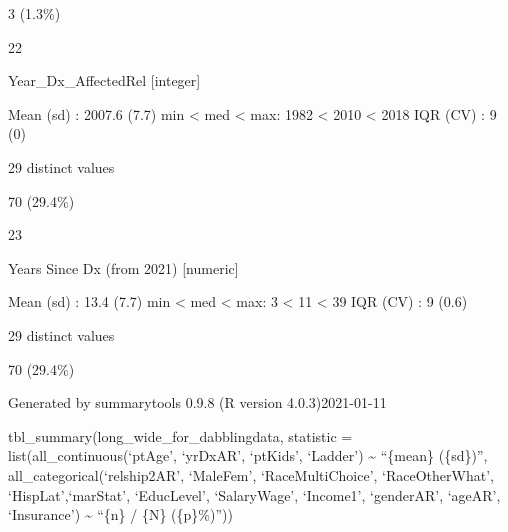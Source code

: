 \documentclass[]{article}
\begin{document}
\begin{enumerate}
  3 (1.3\%)

  22

  Year\_Dx\_AffectedRel {[}integer{]}

  Mean (sd) : 2007.6 (7.7) min \textless{} med \textless{} max: 1982
  \textless{} 2010 \textless{} 2018 IQR (CV) : 9 (0)

  29 distinct values

  70 (29.4\%)

  23

  Years Since Dx (from 2021) {[}numeric{]}

  Mean (sd) : 13.4 (7.7) min \textless{} med \textless{} max: 3
  \textless{} 11 \textless{} 39 IQR (CV) : 9 (0.6)

  29 distinct values

  70 (29.4\%)

  Generated by summarytools 0.9.8 (R version 4.0.3)2021-01-11
\end{enumerate}

tbl\_summary(long\_wide\_for\_dabblingdata, statistic =
list(all\_continuous(`ptAge', `yrDxAR', `ptKids', `Ladder')
\textasciitilde{} ``\{mean\} (\{sd\})'', all\_categorical(`relship2AR',
`MaleFem', `RaceMultiChoice', `RaceOtherWhat', `HispLat',`marStat',
`EducLevel', `SalaryWage', `Income1', `genderAR', `ageAR', `Insurance')
\textasciitilde{} ``\{n\} / \{N\} (\{p\}\%)''))
\end{document}
